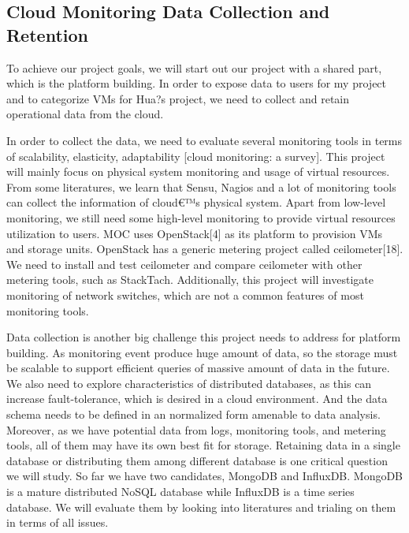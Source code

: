 \subsection{Cloud Monitoring Data Collection and Retention}

To achieve our project goals, we will start out our project with a shared part, which is the platform building. In order to expose data to users for my project and to categorize VMs for Hua?s project, we need to collect and retain operational data from the cloud. 

  In order to collect the data, we need to evaluate several monitoring tools in terms of scalability, elasticity, adaptability [cloud monitoring: a survey]. This project will mainly focus on physical system monitoring and usage of virtual resources. From some literatures, we learn that Sensu, Nagios and a lot of monitoring tools can collect the information of cloud€™s physical system. Apart from low-level monitoring, we still need some high-level monitoring to provide virtual resources utilization to users. MOC uses OpenStack[4] as its platform to provision VMs and storage units. OpenStack has a generic metering project called ceilometer[18]. We need to install and test ceilometer and compare ceilometer with other metering tools, such as StackTach. Additionally, this project will investigate monitoring of network switches, which are not a common features of most monitoring tools. 
  
  Data collection is another big challenge this project needs to address for platform building. As monitoring event produce huge amount of data, so the storage must be scalable to support efficient queries of massive amount of data in the future. We also need to explore characteristics of distributed databases, as this can increase fault-tolerance, which is desired in a cloud environment. And the data schema needs to be defined in an normalized form amenable to data analysis. Moreover, as we have potential data from logs, monitoring tools, and metering tools, all of them may have its own best fit for storage. Retaining data in a single database or distributing them among different database is one critical question we will study. So far we have two candidates, MongoDB and InfluxDB. MongoDB is a mature distributed NoSQL database while InfluxDB is a time series database. We will evaluate them by looking into literatures and trialing on them in terms of all issues.